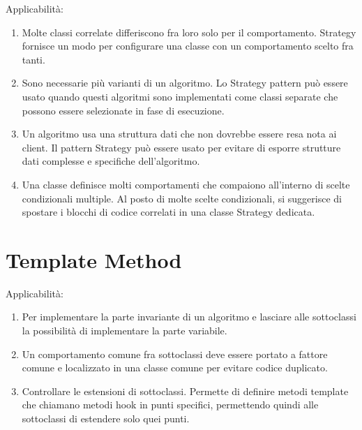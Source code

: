 \documentclass[12pt]{article}
\begin{document}
Applicabilità:
\begin{enumerate}
	\item Molte classi correlate differiscono fra loro solo per il
	      comportamento. Strategy fornisce un modo per configurare una classe
	      con un comportamento scelto fra tanti.

	\item Sono necessarie più varianti di un algoritmo. Lo Strategy pattern può
	      essere usato quando questi algoritmi sono implementati come classi
	      separate che possono essere selezionate in fase di esecuzione.

	\item Un algoritmo usa una struttura dati che non dovrebbe essere resa nota
	      ai client. Il pattern Strategy può essere usato per evitare di esporre
	      strutture dati complesse e specifiche dell'algoritmo.

	\item Una classe definisce molti comportamenti che compaiono
	      all'interno di scelte condizionali multiple. Al posto di molte scelte
	      condizionali, si suggerisce di spostare i blocchi di codice correlati
	      in una classe Strategy dedicata.
\end{enumerate}

\section{Template Method}

Applicabilità:
\begin{enumerate}
	\item Per implementare la parte invariante di un algoritmo e lasciare alle
	      sottoclassi la possibilità di implementare la parte variabile.

	\item Un comportamento comune fra sottoclassi deve essere portato a
	      fattore comune e localizzato in una classe comune per evitare codice
	      duplicato.

	\item Controllare le estensioni di sottoclassi. Permette di definire
	      metodi template che chiamano metodi hook in punti specifici, permettendo
	      quindi alle sottoclassi di estendere solo quei punti.
\end{enumerate}
\end{document}
